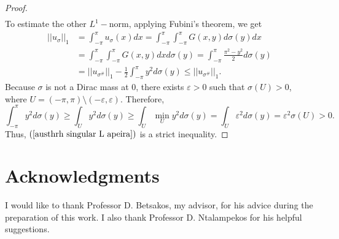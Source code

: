 \documentclass[11pt]{amsart}
\numberwithin{equation}{section}
\begin{document}
\begin{proof}
\begin{align}
\end{align}
To estimate the other \(L^1-\)norm, applying Fubini's theorem, we get
\begin{align}
\nonumber||u_\sigma||_1&=\int_{-\pi}^\pi u_{\sigma}(x)dx=\int_{-\pi}^\pi\int_{-\pi}^\pi G(x,y)d\sigma(y)dx\\
\nonumber&=\int_{-\pi}^\pi\int_{-\pi}^\pi G(x,y)dxd\sigma(y)=\int_{-\pi}^\pi\frac{\pi^2-y^2}{2}d\sigma(y)\\
\label{austhrh singular L apeira}&=||u_{\sigma^\#}||_1-\frac{1}{2}\int_{-\pi}^\pi y^2d\sigma(y)\leq||u_{\sigma^\#}||_1.
\end{align}
Because \(\sigma\) is not a Dirac mass at 0, there exists \(\varepsilon>0\) such that \(\sigma(U)>0\), where \(U=(-\pi,\pi)\setminus(-\varepsilon,\varepsilon).\) Therefore,
\[\int_{-\pi}^\pi y^2d\sigma(y)\geq \int_U y^2d\sigma(y)\geq \int_U \min_{U}y^2d\sigma(y)=\int_U \varepsilon^2d\sigma(y)=\varepsilon^2\sigma(U)>0.\]
Thus, \((\ref{austhrh singular L apeira})\) is a strict inequality.
\end{proof}
\section*{Acknowledgments}
I would like to thank Professor D. Betsakos, my advisor, for his advice during the preparation of this work. I also thank Professor D. Ntalampekos for his helpful suggestions.


\nocite{*}
\end{document}
